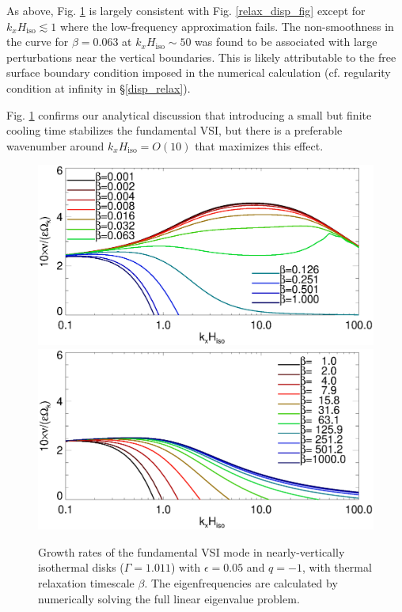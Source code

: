 As above, Fig. \ref{relax_growth_num} is largely consistent with 
Fig. \ref{relax_disp_fig} except for $k_xH_\mathrm{iso}\lesssim 1$
where the low-frequency approximation fails. The non-smoothness in the
curve for $\beta=0.063$ at $k_xH_\mathrm{iso}\sim50$ was found to be
associated with large perturbations near the vertical boundaries. This is
likely attributable to the free surface boundary condition imposed in
the numerical calculation (cf. regularity condition at infinity in
\S\ref{disp_relax}).    

Fig. \ref{relax_growth_num} confirms our analytical discussion that
introducing a small but finite cooling time stabilizes the fundamental
VSI, but there is a preferable wavenumber around $k_xH_\mathrm{iso} =
O(10)$ that maximizes this effect. 

\begin{figure}
   \includegraphics[width=\linewidth,clip=true,trim=0cm 1.75cm 0cm 0cm]{figures/compare_eigen_imag_bloop}
  \includegraphics[width=\linewidth,clip=true,trim=0cm 0cm 0cm 1cm]{figures/compare_eigen_imag_bloop2}
  \caption{Growth rates of the fundamental VSI mode in
    nearly-vertically isothermal disks ($\Gamma=1.011$) with
    $\epsilon=0.05$ and $q=-1$, with thermal relaxation timescale
    $\beta$. The eigenfrequencies are calculated by numerically
    solving the full linear eigenvalue problem. \label{relax_growth_num}}   
\end{figure}   

